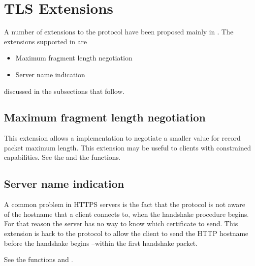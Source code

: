 \section{TLS Extensions}

A number of extensions to the \tls{} protocol have been proposed 
mainly in \cite{TLSEXT}. The extensions supported in \gnutls{} are
\begin{itemize}
\item Maximum fragment length negotiation
\item Server name indication
\end{itemize}
discussed in the subsections that follow.

\subsection{Maximum fragment length negotiation}

This extension allows a \tlsI{} implementation to negotiate
a smaller value for record packet maximum length. This extension
may be useful to clients with constrained capabilities. See
the 
and the 
functions.

\subsection{Server name indication}

A common problem in HTTPS servers is the fact that the \tls{}
protocol is not aware of the hostname that a client connects to, when
the handshake procedure begins. For that reason the \tls{} server
has no way to know which certificate to send. This extension is hack
to the \tls{} protocol to allow the client to send the HTTP hostname
before the handshake begins --within the first handshake packet.

See the functions
 and
.


